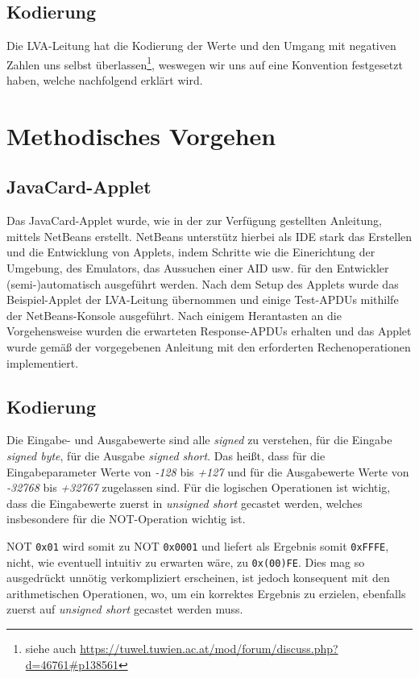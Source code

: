 \documentclass[paper=a4, fontsize=11pt]{scrartcl}
\begin{document}
\subsection{Kodierung}
Die LVA-Leitung hat die Kodierung der Werte und den Umgang mit negativen Zahlen uns selbst überlassen\footnote{siehe auch \url{https://tuwel.tuwien.ac.at/mod/forum/discuss.php?d=46761\#p138561}}, weswegen wir uns auf eine Konvention festgesetzt haben, welche nachfolgend erklärt wird.


\section{Methodisches Vorgehen}
\subsection{JavaCard-Applet}
Das JavaCard-Applet wurde, wie in der zur Verfügung gestellten Anleitung, mittels NetBeans erstellt. NetBeans unterstütz hierbei als IDE stark das Erstellen und die Entwicklung von Applets, indem Schritte wie die Einerichtung der Umgebung, des Emulators, das Aussuchen einer AID usw. für den Entwickler (semi-)automatisch ausgeführt werden.
Nach dem Setup des Applets wurde das Beispiel-Applet der LVA-Leitung übernommen und einige Test-APDUs mithilfe der NetBeans-Konsole ausgeführt. Nach einigem Herantasten an die Vorgehensweise wurden die erwarteten Response-APDUs erhalten und das Applet wurde gemäß der vorgegebenen Anleitung mit den erforderten Rechenoperationen implementiert.

\subsection{Kodierung}
Die Eingabe- und Ausgabewerte sind alle \textit{signed} zu verstehen, für die Eingabe \textit{signed byte}, für die Ausgabe \textit{signed short}. Das heißt, dass für die Eingabeparameter Werte von \textit{-128} bis \textit{+127} und für die Ausgabewerte Werte von \textit{-32768} bis \textit{+32767} zugelassen sind. Für die logischen Operationen ist wichtig, dass die Eingabewerte zuerst in \textit{unsigned short} gecastet werden, welches insbesondere für die NOT-Operation wichtig ist.

NOT \texttt{0x01} wird somit zu NOT \texttt{0x0001} und liefert als Ergebnis somit \texttt{0xFFFE}, nicht, wie eventuell intuitiv zu erwarten wäre, zu \texttt{0x(00)FE}. Dies mag so ausgedrückt unnötig verkompliziert erscheinen, ist jedoch konsequent mit den arithmetischen Operationen, wo, um ein korrektes Ergebnis zu erzielen, ebenfalls zuerst auf \textit{unsigned short} gecastet werden muss.
\end{document}
